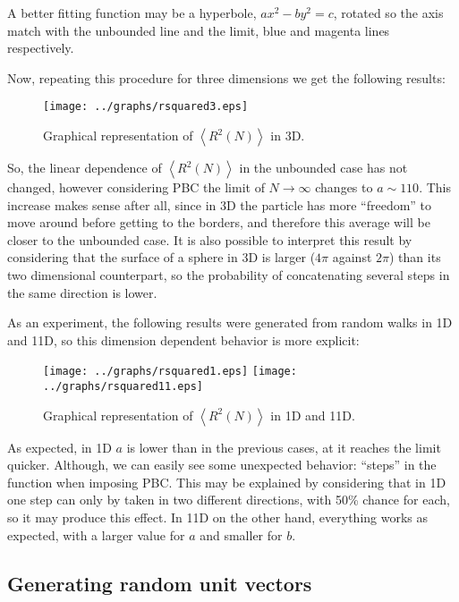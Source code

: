 \documentclass[10 pt]{article}
\newcommand{\avg}[1]{\left\langle #1 \right\rangle}
\begin{document}
A better fitting function may be a hyperbole, $ax^2 - by^2 = c$, rotated so the axis match with the unbounded line and the limit, blue and magenta lines respectively.

Now, repeating this procedure for three dimensions we get the following results:

\begin{figure}[H]
  \begin{center}
    \texttt{[image: ../graphs/rsquared3.eps]}
    \caption{Graphical representation of $\avg{R^2(N)}$ in 3D.}
  \end{center}
\end{figure}

So, the linear dependence of $\avg{R^2(N)}$ in the unbounded case has not changed, however considering PBC the limit of $N \rightarrow \infty$ changes to $a \sim 110$. This increase makes sense after all, since in 3D the particle has more ``freedom'' to move around before getting to the borders, and therefore this average will be closer to the unbounded case. It is also possible to interpret this result by considering that the surface of a sphere in 3D is larger ($4\pi$ against $2\pi$) than its two dimensional counterpart, so the probability of concatenating several steps in the same direction is lower.

As an experiment, the following results were generated from random walks in 1D and 11D, so this dimension dependent behavior is more explicit:

\begin{figure}[H]
  \begin{center}
    \texttt{[image: ../graphs/rsquared1.eps]}
    \texttt{[image: ../graphs/rsquared11.eps]}
    \caption{Graphical representation of $\avg{R^2(N)}$ in 1D and 11D.}
  \end{center}
\end{figure}

As expected, in 1D $a$ is lower than in the previous cases, at it reaches the limit quicker. Although, we can easily see some unexpected behavior: ``steps'' in the function when imposing PBC. This may be explained by considering that in 1D one step can only by taken in two different directions, with 50\% chance for each, so it may produce this effect. In 11D on the other hand, everything works as expected, with a larger value for $a$ and smaller for $b$.

\subsection{Generating random unit vectors}
\end{document}
